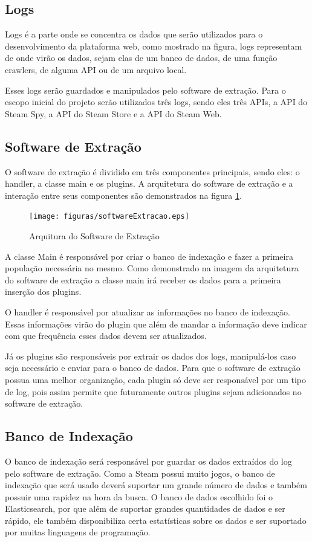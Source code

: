 \subsection{Logs}
Logs é a parte onde se concentra os dados que serão utilizados para o desenvolvimento da plataforma web, como mostrado na figura, logs representam de onde virão os dados, sejam elas de um banco de dados, de uma função crawlers, de alguma API ou de um arquivo local.

Esses logs serão guardados e manipulados pelo software de extração. Para o escopo inicial do projeto serão utilizados três logs, sendo eles três APIs, a API do Steam Spy, a API do Steam Store e a API do Steam Web.
\subsection{Software de Extração}
O software de extração é dividido em três componentes principais, sendo eles: o handler, a classe main e os plugins. A arquitetura do software de extração e a interação entre seus componentes são demonstrados na figura \ref{image:extracao}.
\begin{figure}
\centering
\texttt{[image: figuras/softwareExtracao.eps]}
\caption{Arquitura do Software de Extração}
\label{image:extracao}
\end{figure}
A classe Main é responsável por criar o banco de indexação e fazer a primeira população necessária no mesmo. Como demonstrado na imagem da arquitetura do software de extração a classe main irá receber os dados para a primeira inserção dos plugins.

O handler é responsável por atualizar as informações no banco de indexação. Essas informações virão do plugin que além de mandar a informação deve indicar com que frequência esses dados devem ser atualizados.

Já os plugins são responsáveis por extrair os dados dos logs, manipulá-los caso seja necessário e enviar para o banco de dados. Para que o software de extração possua uma melhor organização, cada plugin só deve ser responsável por um tipo de log, pois assim permite que futuramente outros plugins sejam adicionados no software de extração.
\subsection{Banco de Indexação}
O banco de indexação será responsável por guardar os dados extraídos do log pelo software de extração. Como a Steam possui muito jogos, o banco de indexação que será usado deverá suportar um grande número de dados e também possuir uma rapidez na hora da busca. O banco de dados escolhido foi o Elasticsearch, por que além de suportar grandes quantidades de dados e ser rápido, ele também disponibiliza certa estatísticas sobre os dados e ser suportado por muitas linguagens de programação.
